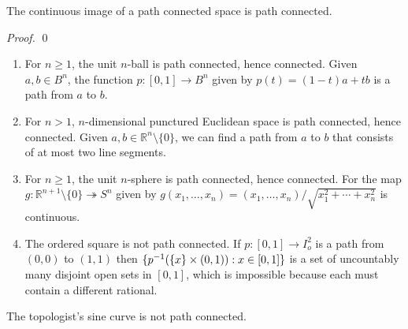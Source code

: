 \begin{prop}
  The continuous image of a path connected space is path connected.
\end{prop}

\begin{proof}
  \pf
  \qed
\end{proof}

\begin{ex}
  \begin{enumerate}
    \item For $n \geq 1$, the unit $n$-ball is path connected, hence connected. Given $a, b \in B^n$, the function $p : [0,1] \rightarrow B^n$ given by $p(t) = (1-t)a + tb$ is a path from $a$ to $b$.
    \item For $n > 1$, $n$-dimensional punctured Euclidean space is path connected, hence connected. Given $a, b \in \mathbb{R}^n \setminus \{0\}$, we can find a path from $a$ to $b$ that consists of at most two line segments.
    \item For $n \geq 1$, the unit $n$-sphere is path connected, hence connected. For the map $g : \mathbb{R}^{n+1} \setminus \{ 0 \} \twoheadrightarrow S^n$ given by $g(x_1, \ldots, x_n) = (x_1, \ldots, x_n) / \sqrt{x_1^2 + \cdots + x_n^2}$ is continuous.
    \item The ordered square is not path connected. If $p : [0,1] \rightarrow I_o^2$ is a path from $(0,0)$ to $(1,1)$ then $\{ {p}^{-1}(\{x\} \times (0,1)) : x \in [0,1] \}$ is a set of uncountably many disjoint open sets in $[0,1]$, which is impossible because each must contain a different rational.
  \end{enumerate}
\end{ex}

\begin{prop}[DC]
  The topologist's sine curve is not path connected.
\end{prop}


